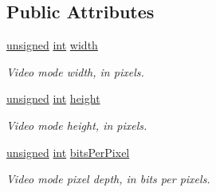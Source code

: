 \subsection*{Public Attributes}
\begin{DoxyCompactItemize}
\item 
\hyperlink{curses_8priv_8h_aca40206900cfc164654362fa8d4ad1e6}{unsigned} \hyperlink{term__entry_8h_ad65b480f8c8270356b45a9890f6499ae}{int} \hyperlink{classsf_1_1_video_mode_a9b3b2ad2cac6b9c266823fb5ed506d90}{width}
\begin{DoxyCompactList}\small\item\em Video mode width, in pixels. \end{DoxyCompactList}\item 
\hyperlink{curses_8priv_8h_aca40206900cfc164654362fa8d4ad1e6}{unsigned} \hyperlink{term__entry_8h_ad65b480f8c8270356b45a9890f6499ae}{int} \hyperlink{classsf_1_1_video_mode_a5a88d44c9470db7474361a42a189342d}{height}
\begin{DoxyCompactList}\small\item\em Video mode height, in pixels. \end{DoxyCompactList}\item 
\hyperlink{curses_8priv_8h_aca40206900cfc164654362fa8d4ad1e6}{unsigned} \hyperlink{term__entry_8h_ad65b480f8c8270356b45a9890f6499ae}{int} \hyperlink{classsf_1_1_video_mode_aa080f1ef96a1008d58b1920eceb189df}{bits\-Per\-Pixel}
\begin{DoxyCompactList}\small\item\em Video mode pixel depth, in bits per pixels. \end{DoxyCompactList}\end{DoxyCompactItemize}
